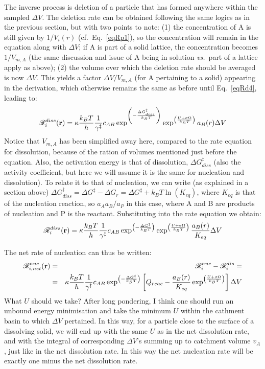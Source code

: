 \documentclass[12pt]{paper}    %
\newcommand{\RR}{\mathscr{R}}
\newcommand{\vs}{\textit{vs.}~}
\newcommand{\eqname}{Eq.~}
\begin{document}
The inverse process is deletion of a particle that has formed anywhere within the sampled $\Delta V$. The deletion rate can be obtained following the same logics as in the previous section, but with two points to note: (1) the concentration of A is still given by $1/V_i(r)$ (cf.~\eqname\ref{eqRp1}), so the concentration will remain in the equation along with $\Delta V$; if A is part of a solid lattice, the concentration becomes $1/V_{m,A}$ (the same discussion and issue of A being in solution \vs part of a lattice apply as above); (2) the volume over which the deletion rate should be averaged is now $\Delta V$. This yields a factor $\Delta V/V_{m,A}$ (for A pertaining to a solid) appearing in the derivation, which otherwise remains the same as before until \eqname\ref{eqRd4}, leading to:
%
\begin{equation}
\RR^{diss}_i ({\bf r}) = \kappa \frac{k_BT}{h} \frac{1}{\gamma^\ddag} c_{AB}\exp^{\left( - \frac{\Delta G^\ddag_{diss}}{k_BT}\right)} \exp^{\left( \frac{U + \sigma \Omega}{k_BT}\right)} a_B(r)  \Delta V
\end{equation}
%
Notice that $V_{m,A}$ has been simplified away here, compared to the rate equation for dissolution, because of the ration of volumes mentioned just before the equation. Also, the activation energy is that of dissolution, $\Delta G^\ddag_{diss}$ (also the activity coefficient, but here we will assume it is the same for nucleation and dissolution). To relate it to that of nucleation, we can write (as explained in a section above) $\Delta G^\ddag_{diss} = \Delta G^\ddag  - \Delta G_{r} = \Delta G^\ddag  + k_BT \ln(K_{eq})$, where $K_{eq}$ is that of the nucleation reaction, so $a_Aa_B/a_P$ in this case, where A and B are products of nucleation and P is the reactant. Substituting into the rate equation we obtain:
%
\begin{equation}
\RR^{diss}_i ({\bf r}) = \kappa \frac{k_BT}{h} \frac{1}{\gamma^\ddag} c_{AB}\exp^{\left( - \frac{\Delta G^\ddag}{k_BT}\right)} \exp^{\left( \frac{U + \sigma \Omega}{k_BT}\right)} \frac{a_B(r)}{K_{eq}}  \Delta V
\end{equation}
%

The net rate of nucleation can thus be written:
%
\begin{eqnarray}
\RR^{nuc}_{i,net}({\bf r}) &=& \RR^{nuc}_{i} - \RR^{dis}_{i} = \nonumber \\
&=&\kappa \frac{k_BT}{h} \frac{1}{\gamma^\ddag} c_{AB}\exp^{\left( - \frac{\Delta G^\ddag}{k_BT}\right)} \left[ Q_{reac} - \frac{a_B(r)}{K_{eq}} \exp^{\left( \frac{U + \sigma \Omega}{k_BT}\right)}  \right] \Delta V \label{eqRn}
\end{eqnarray}
%
What $U$ should we take? After long pondering, I think one should run an unbound energy minimisation and take the minimum $U$ within the cathment basin to which $\Delta V$ pertained. In this way, for a particle close to the surface of a dissolving solid, we will end up with the same $U$ as in the net dissolution rate, and with the  integral of corresponding $\Delta V$'s summing up to catchment volume $v_A$, just like in the net dissolution rate. In this way the net nucleation rate will be exactly one minus the net dissolution rate.
\end{document}
